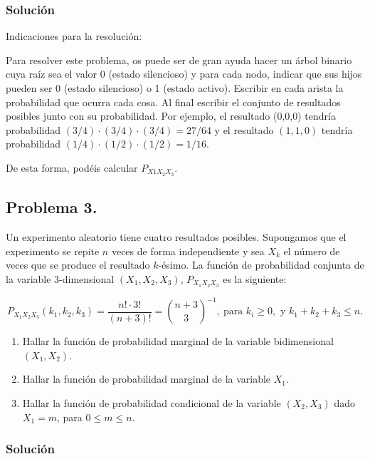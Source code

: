 \documentclass[
]{article}
\providecommand{\tightlist}{%
  \setlength{\itemsep}{0pt}\setlength{\parskip}{0pt}}
\begin{document}
\hypertarget{soluciuxf3n-1}{%
\subsubsection{Solución}\label{soluciuxf3n-1}}

Indicaciones para la resolución:

Para resolver este problema, os puede ser de gran ayuda hacer un árbol
binario cuya raíz sea el valor 0 (estado silencioso) y para cada nodo,
indicar que sus hijos pueden ser 0 (estado silencioso) o 1 (estado
activo). Escribir en cada arista la probabilidad que ocurra cada cosa.
Al final escribir el conjunto de resultados posibles junto con su
probabilidad. Por ejemplo, el resultado (0,0,0) tendría probabilidad
\((3/4)\cdot (3/4)\cdot (3/4)=27/64\) y el resultado \((1,1,0)\) tendría
probabilidad \((1/4)\cdot (1/2)\cdot (1/2)=1/16\).

De esta forma, podéis calcular \(P_{X1 X_2 X_3}\).

\hypertarget{problema-3.}{%
\subsection{Problema 3.}\label{problema-3.}}

Un experimento aleatorio tiene cuatro resultados posibles. Supongamos
que el experimento se repite \(n\) veces de forma independiente y sea
\(X_k\) el número de veces que se produce el resultado \(k\)-ésimo. La
función de probabilidad conjunta de la variable \(3\)-dimensional
\((X_1,X_2,X_3)\), \(P_{X_1X_2X_3}\) es la siguiente:

\[
P_{X_1 X_2 X_3}(k_1,k_2,k_3)=\frac{n!\cdot 3!}{(n+3)!}=\binom{n+3}{3}^{-1}, \ \mbox{para }k_i\geq 0,\mbox{ y }k_1+k_2+k_3\leq n.
\]

\begin{enumerate}
\def\labelenumi{\arabic{enumi}.}
\tightlist
\item
  Hallar la función de probabilidad marginal de la variable
  bidimensional \((X_1,X_2)\).
\item
  Hallar la función de probabilidad marginal de la variable \(X_1\).
\item
  Hallar la función de probabilidad condicional de la variable
  \((X_2,X_3)\) dado \(X_1=m\), para \(0\leq m\leq n\).
\end{enumerate}

\hypertarget{soluciuxf3n-2}{%
\subsubsection{Solución}\label{soluciuxf3n-2}}
\end{document}
